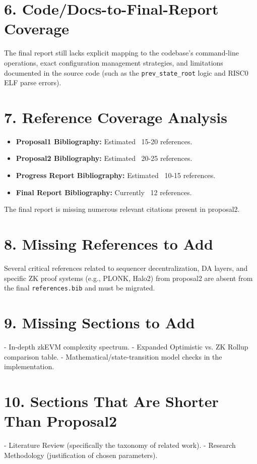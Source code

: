 \documentclass[12pt]{article}
\begin{document}
\section{6. Code/Docs-to-Final-Report Coverage}
The final report still lacks explicit mapping to the codebase's command-line operations, exact configuration management strategies, and limitations documented in the source code (such as the \texttt{prev\_state\_root} logic and RISC0 ELF parse errors).

\section{7. Reference Coverage Analysis}
\begin{itemize}
    \item \textbf{Proposal1 Bibliography:} Estimated ~15-20 references.
    \item \textbf{Proposal2 Bibliography:} Estimated ~20-25 references.
    \item \textbf{Progress Report Bibliography:} Estimated ~10-15 references.
    \item \textbf{Final Report Bibliography:} Currently ~12 references.
\end{itemize}
The final report is missing numerous relevant citations present in proposal2.

\section{8. Missing References to Add}
Several critical references related to sequencer decentralization, DA layers, and specific ZK proof systems (e.g., PLONK, Halo2) from proposal2 are absent from the final \texttt{references.bib} and must be migrated.

\section{9. Missing Sections to Add}
- In-depth zkEVM complexity spectrum.
- Expanded Optimistic vs. ZK Rollup comparison table.
- Mathematical/state-transition model checks in the implementation.

\section{10. Sections That Are Shorter Than Proposal2}
- Literature Review (specifically the taxonomy of related work).
- Research Methodology (justification of chosen parameters).
\end{document}
